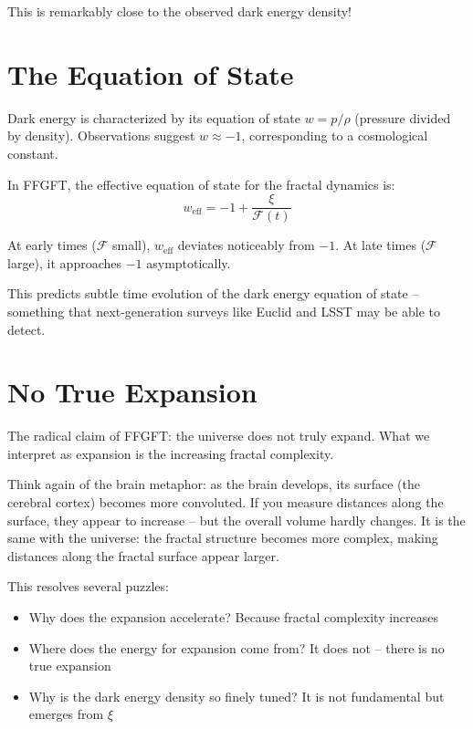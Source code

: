 This is remarkably close to the observed dark energy density!

\section{The Equation of State}

Dark energy is characterized by its equation of state $w = p/\rho$ (pressure divided by density). Observations suggest $w \approx -1$, corresponding to a cosmological constant.

In FFGFT, the effective equation of state for the fractal dynamics is:
\begin{equation}
w_{\text{eff}} = -1 + \frac{\xi}{\mathcal{F}(t)}
\end{equation}

At early times ($\mathcal{F}$ small), $w_{\text{eff}}$ deviates noticeably from $-1$. At late times ($\mathcal{F}$ large), it approaches $-1$ asymptotically.

This predicts subtle time evolution of the dark energy equation of state -- something that next-generation surveys like Euclid and LSST may be able to detect.

\section{No True Expansion}

The radical claim of FFGFT: the universe does not truly expand. What we interpret as expansion is the increasing fractal complexity.

Think again of the brain metaphor: as the brain develops, its surface (the cerebral cortex) becomes more convoluted. If you measure distances along the surface, they appear to increase -- but the overall volume hardly changes. It is the same with the universe: the fractal structure becomes more complex, making distances along the fractal surface appear larger.

This resolves several puzzles:
\begin{itemize}[leftmargin=*]
\item Why does the expansion accelerate? Because fractal complexity increases
\item Where does the energy for expansion come from? It does not -- there is no true expansion
\item Why is the dark energy density so finely tuned? It is not fundamental but emerges from $\xi$
\end{itemize}

